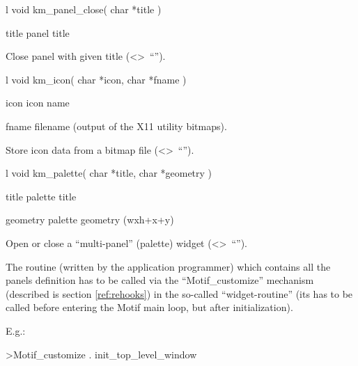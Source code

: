 \begin{Gray}{l}
void km_panel_close( char *title )
\end{Gray}
\Pdesc\begin{DLtt}{\mbox{\hspace{7em}}}
\item[title] panel title
\end{DLtt}
Close panel with given title (<>~``'').

\begin{Gray}{l}
void km_icon( char *icon, char *fname )
\end{Gray}
\Pdesc\begin{DLtt}{\mbox{\hspace{7em}}}
\item[icon] icon name
\item[fname] filename (output of the X11 utility bitmaps).
\end{DLtt}
Store icon data from a bitmap file (<>~``'').

\begin{Gray}{l}
void km_palette( char *title, char *geometry )
\end{Gray}
\Pdesc\begin{DLtt}{\mbox{\hspace{7em}}}
\item[title] palette title
\item[geometry] palette geometry (wxh+x+y)
\end{DLtt}
Open or close a ``multi-panel'' (palette) widget
(<>~``'').
 
The routine (written by the application programmer) which contains
all the panels definition has to be called via the ``Motif\_customize''
mechanism (described is section \ref{ref:rehooks}) in the so-called
``widget-routine'' (its has to be called before entering the Motif
main loop, but after initialization).
 
E.g.:
\begin{XMP}
>Motif\_customize . init_top_level_window%
\end{XMP}
 
